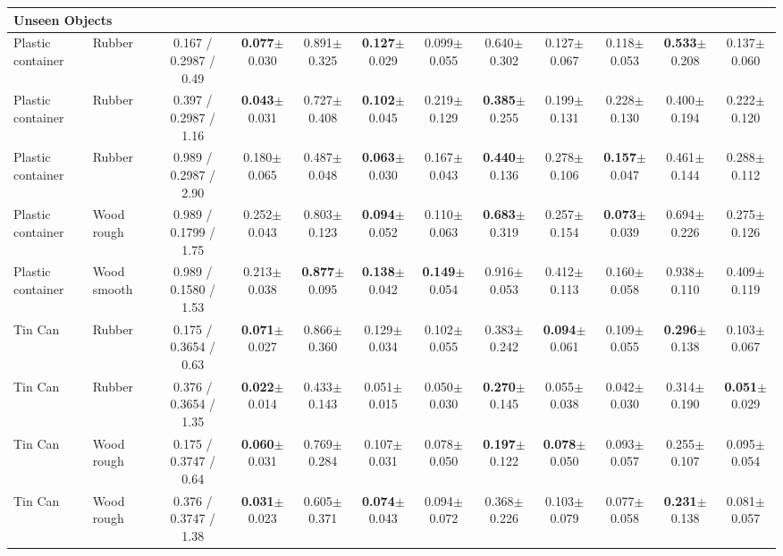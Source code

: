 \begin{table}[t]
{\begin{tabular}{l l c c c c c c c c c c }
        \midrule
        \multicolumn{12}{l}{\textbf{Unseen Objects}} \\
        \midrule
        Plastic container & Rubber & 0.167 / 0.2987 / 0.49 & \textbf{0.077}$\pm$0.030 & 0.891$\pm$0.325 & \textbf{0.127}$\pm$0.029 & 0.099$\pm$0.055 & 0.640$\pm$0.302 & 0.127$\pm$0.067 & 0.118$\pm$0.053 & \textbf{0.533}$\pm$0.208 & 0.137$\pm$0.060 \\
        Plastic container & Rubber & 0.397 / 0.2987 / 1.16 & \textbf{0.043}$\pm$0.031 & 0.727$\pm$0.408 & \textbf{0.102}$\pm$0.045 & 0.219$\pm$0.129 & \textbf{0.385}$\pm$0.255 & 0.199$\pm$0.131 & 0.228$\pm$0.130 & 0.400$\pm$0.194 & 0.222$\pm$0.120 \\
        Plastic container & Rubber & 0.989 / 0.2987 / 2.90 & 0.180$\pm$0.065 & 0.487$\pm$0.048 & \textbf{0.063}$\pm$0.030 & 0.167$\pm$0.043 & \textbf{0.440}$\pm$0.136 & 0.278$\pm$0.106 & \textbf{0.157}$\pm$0.047 & 0.461$\pm$0.144 & 0.288$\pm$0.112 \\
        Plastic container & Wood rough & 0.989 / 0.1799 / 1.75 & 0.252$\pm$0.043 & 0.803$\pm$0.123 & \textbf{0.094}$\pm$0.052 & 0.110$\pm$0.063 & \textbf{0.683}$\pm$0.319 & 0.257$\pm$0.154 & \textbf{0.073}$\pm$0.039 & 0.694$\pm$0.226 & 0.275$\pm$0.126 \\
        Plastic container & Wood smooth & 0.989 / 0.1580 / 1.53 & 0.213$\pm$0.038 & \textbf{0.877}$\pm$0.095 & \textbf{0.138}$\pm$0.042 & \textbf{0.149}$\pm$0.054 & 0.916$\pm$0.053 & 0.412$\pm$0.113 & 0.160$\pm$0.058 & 0.938$\pm$0.110 & 0.409$\pm$0.119 \\
        Tin Can & Rubber & 0.175 / 0.3654 / 0.63 & \textbf{0.071}$\pm$0.027 & 0.866$\pm$0.360 & 0.129$\pm$0.034 & 0.102$\pm$0.055 & 0.383$\pm$0.242 & \textbf{0.094}$\pm$0.061 & 0.109$\pm$0.055 & \textbf{0.296}$\pm$0.138 & 0.103$\pm$0.067 \\
        Tin Can & Rubber & 0.376 / 0.3654 / 1.35 & \textbf{0.022}$\pm$0.014 & 0.433$\pm$0.143 & 0.051$\pm$0.015 & 0.050$\pm$0.030 & \textbf{0.270}$\pm$0.145 & 0.055$\pm$0.038 & 0.042$\pm$0.030 & 0.314$\pm$0.190 & \textbf{0.051}$\pm$0.029 \\
        Tin Can & Wood rough & 0.175 / 0.3747 / 0.64 & \textbf{0.060}$\pm$0.031 & 0.769$\pm$0.284 & 0.107$\pm$0.031 & 0.078$\pm$0.050 & \textbf{0.197}$\pm$0.122 & \textbf{0.078}$\pm$0.050 & 0.093$\pm$0.057 & 0.255$\pm$0.107 & 0.095$\pm$0.054 \\
        Tin Can & Wood rough & 0.376 / 0.3747 / 1.38 & \textbf{0.031}$\pm$0.023 & 0.605$\pm$0.371 & \textbf{0.074}$\pm$0.043 & 0.094$\pm$0.072 & 0.368$\pm$0.226 & 0.103$\pm$0.079 & 0.077$\pm$0.058 & \textbf{0.231}$\pm$0.138 & 0.081$\pm$0.057 \\

\end{tabular}}
\end{table}
